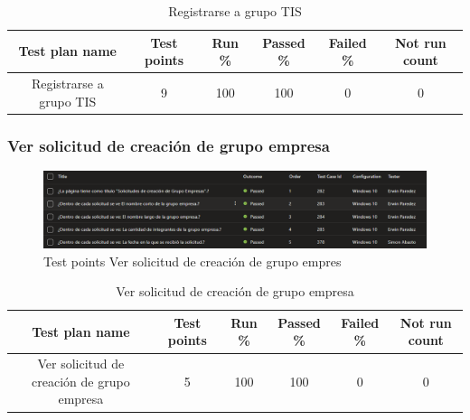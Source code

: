 \documentclass[12pt,letterpaper]{article}
\begin{document}
\begin{table}[h] %
    \centering %
    \caption{Registrarse a grupo TIS} %
     \begin{tabular}{|c|c|c|c|c|c|}
       \rowcolor{green} %
    \hline
    Test plan name & Test points & Run \% & Passed \% & Failed \% & Not run count \\
    \hline
    Registrarse a grupo TIS    & 9   & 100   & 100     & 0    & 0    \\
    \hline
    \end{tabular}
    \end{table}



\subsubsection{Ver solicitud de creación de grupo empresa}
 \begin{figure}[H]
        \centering
        \includegraphics[width=1\linewidth]{cases ver solicitud de creacion de grupo empresa.png}
        \caption{Test points Ver solicitud de creación de grupo empres}
    \end{figure}


\begin{table}[h] %
    \centering %
    \caption{Ver solicitud de creación de grupo empresa} %
     \begin{tabular}{|c|c|c|c|c|c|}
       \rowcolor{green}%
    \hline
    Test plan name & Test points & Run \% & Passed \% & Failed \% & Not run count \\
    \hline
    Ver solicitud de creación de grupo empresa    & 5    & 100   & 100    & 0    & 0    \\
    \hline
    \end{tabular}
    \end{table}

\end{document}
